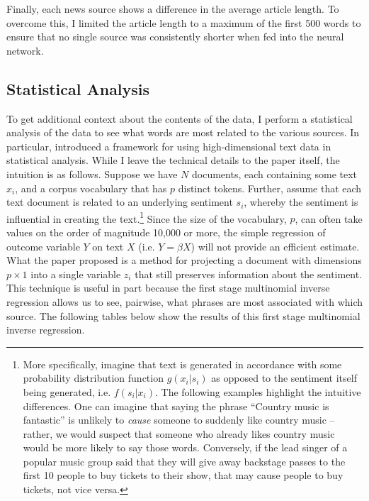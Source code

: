 \documentclass{article}
\begin{document}
	    Finally, each news source shows a difference in the average article length. To overcome this, I limited the article length to a maximum of the first 500 words to ensure that no single source was consistently shorter when fed into the neural network. 
	    
	    \subsection{Statistical Analysis}
	    To get additional context about the contents of the data, I perform a statistical analysis of the data to see what words are most related to the various sources. In particular, \citet{taddy2013multinomial} introduced a framework for using high-dimensional text data in statistical analysis. While I leave the technical details to the paper itself, the intuition is as follows. Suppose we have $N$ documents, each containing some text $x_i$, and a corpus vocabulary that has $p$ distinct tokens. Further, assume that each text document is related to an underlying sentiment $s_i$, whereby the sentiment is influential in creating the text.\footnote{More specifically, imagine that text is generated in accordance with some probability distribution function $g(x_i | s_i)$ as opposed to the sentiment itself being generated, i.e. $f(s_i | x_i)$. The following examples highlight the intuitive differences. One can imagine that saying the phrase ``Country music is fantastic'' is unlikely to \textit{cause} someone to suddenly like country music -- rather, we would suspect that someone who already likes country music would be more likely to say those words. Conversely, if the lead singer of a popular music group said that they will give away backstage passes to the first 10 people to buy tickets to their show, that may cause people to buy tickets, not vice versa.} Since the size of the vocabulary, $p$, can often take values on the order of magnitude 10,000 or more, the simple regression of outcome variable $Y$ on text $X$ (i.e. $Y= \beta X$) will not provide an efficient estimate. What the paper proposed is a method for projecting a document with dimensions $p \times 1$ into a single variable $z_i$ that still preserves information about the sentiment. This technique is useful in part because the first stage multinomial inverse regression allows us to see, pairwise, what phrases are most associated with which source. The following tables below show the results of this first stage multinomial inverse regression. 
	    
	    
	    
	    
		
\end{document}
